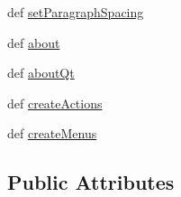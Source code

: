 \begin{DoxyCompactItemize}
\item 
def \hyperlink{classmenus_1_1MainWindow_a44c0d842f1256ba261fffe00fee8c482}{set\+Paragraph\+Spacing}
\item 
def \hyperlink{classmenus_1_1MainWindow_a1ebe05ebc4b6f4d18602916e2f2dd02e}{about}
\item 
def \hyperlink{classmenus_1_1MainWindow_a0e98ce49ebe78321e02283d0ac94d67a}{about\+Qt}
\item 
def \hyperlink{classmenus_1_1MainWindow_a0c1618cad141e7f3357fa6f491de8668}{create\+Actions}
\item 
def \hyperlink{classmenus_1_1MainWindow_abc8c07eb60ad6ba5bc2c51180a785f41}{create\+Menus}
\end{DoxyCompactItemize}
\subsection*{Public Attributes}
